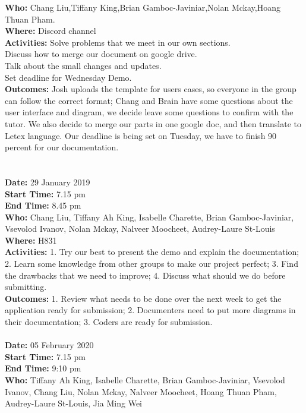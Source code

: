 \documentclass[12pt]{article}
\begin{document}
{\bf Who:} Chang Liu,Tiffany King,Brian Gamboc-Javiniar,Nolan Mckay,Hoang Thuan Pham.\\
{\bf Where:} Discord channel \\
{\bf Activities:} Solve problems that we meet in our own sections. \\
Discuss how to merge our document on google drive.\\
Talk about the small changes and updates.\\
Set deadline for Wednesday Demo.\\
{\bf Outcomes:} Josh uploads the template for users cases, so everyone in the group can follow the correct format;
Chang and Brain have some questions about the user interface and diagram, we decide leave some questions to confirm with the tutor. We also decide to merge our parts in one google doc, and then translate to Letex language. Our deadline is being set on Tuesday, we have to finish 90 percent for our documentation.\\\\\\
{\bf Date:} 29 January 2019\\
{\bf Start Time:} 7.15 pm\\
{\bf End Time:} 8.45 pm \\
{\bf Who:} Chang Liu, Tiffany Ah King, Isabelle Charette, Brian Gamboc-Javiniar, Vsevolod Ivanov, Nolan Mckay, Nalveer Moocheet, Audrey-Laure St-Louis\\
{\bf Where:} H831 \\
{\bf Activities:} 
1. Try our best to present the demo and explain the documentation;
2. Learn some knowledge from other groups to make our project perfect;
3. Find the drawbacks that we need to improve; 
4. Discuss what should we do before submitting. \\
{\bf Outcomes:} 
1. Review what needs to be done over the next week to get the application ready for submission; 
2. Documenters need to put more diagrams in their documentation;
3. Coders are ready for submission.\\\\
{\bf Date:} 05 February 2020\\
{\bf Start Time:} 7.15 pm\\
{\bf End Time:}  9:10 pm\\
{\bf Who:} Tiffany Ah King, Isabelle Charette, Brian Gamboc-Javiniar, Vsevolod Ivanov, Chang Liu, Nolan Mckay, Nalveer Moocheet, Hoang Thuan Pham, Audrey-Laure St-Louis, Jia Ming Wei\\
\end{document}
